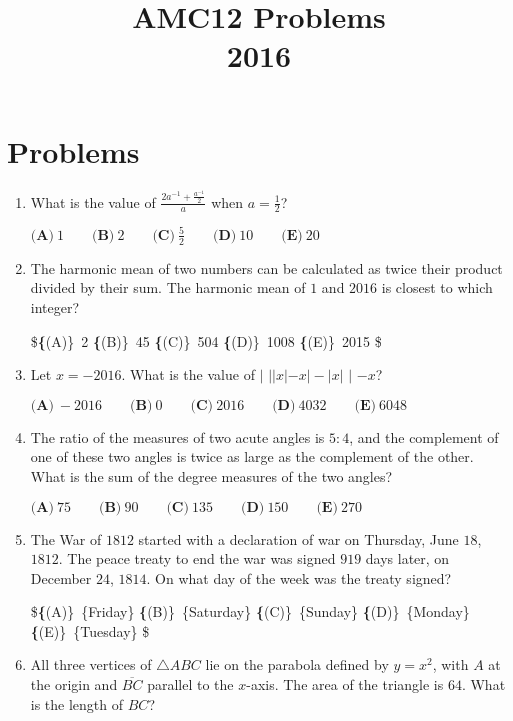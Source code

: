 \documentclass{article}
\title{AMC12 Problems \\ 2016}
\date{}
\begin{document}
\maketitle\thispagestyle{fancy}\newpage\section*{Problems}\begin{enumerate}[label=\arabic*., itemsep=0.5em]\item What is the value of $\frac{2a^{-1}+\frac{a^{-1}}{2}}{a}$ when $a= \frac{1}{2}$?

$\textbf{(A)}\ 1\qquad\textbf{(B)}\ 2\qquad\textbf{(C)}\ \frac{5}{2}\qquad\textbf{(D)}\ 10\qquad\textbf{(E)}\ 20$\par \vspace{0.5em}\item The harmonic mean of two numbers can be calculated as twice their product divided by their sum. The harmonic mean of $1$ and $2016$ is closest to which integer?

\$\textbf\{(A)\}\ 2 \qquad
\textbf\{(B)\}\ 45 \qquad
\textbf\{(C)\}\ 504 \qquad
\textbf\{(D)\}\ 1008 \qquad
\textbf\{(E)\}\ 2015 \$\par \vspace{0.5em}\item Let $x=-2016$. What is the value of $\bigg|$ $||x|-x|-|x|$ $\bigg|$ $-x$?

$\textbf{(A)}\ -2016\qquad\textbf{(B)}\ 0\qquad\textbf{(C)}\ 2016\qquad\textbf{(D)}\ 4032\qquad\textbf{(E)}\ 6048$\par \vspace{0.5em}\item The ratio of the measures of two acute angles is $5:4$, and the complement of one of these two angles is twice as large as the complement of the other. What is the sum of the degree measures of the two angles?

$\textbf{(A)}\ 75\qquad\textbf{(B)}\ 90\qquad\textbf{(C)}\ 135\qquad\textbf{(D)}\ 150\qquad\textbf{(E)}\ 270$\par \vspace{0.5em}\item The War of $1812$ started with a declaration of war on Thursday, June $18$, $1812$. The peace treaty to end the war was signed $919$ days later, on December $24$, $1814$. On what day of the week was the treaty signed? 

\$\textbf\{(A)\}\ \text\{Friday\} \qquad
\textbf\{(B)\}\ \text\{Saturday\} \qquad
\textbf\{(C)\}\ \text\{Sunday\} \qquad
\textbf\{(D)\}\ \text\{Monday\} \qquad
\textbf\{(E)\}\ \text\{Tuesday\} \$\par \vspace{0.5em}\item All three vertices of $\bigtriangleup ABC$ lie on the parabola defined by $y=x^2$, with $A$ at the origin and $\overline{BC}$ parallel to the $x$-axis. The area of the triangle is $64$. What is the length of $BC$?  


\end{enumerate}
\end{document}
